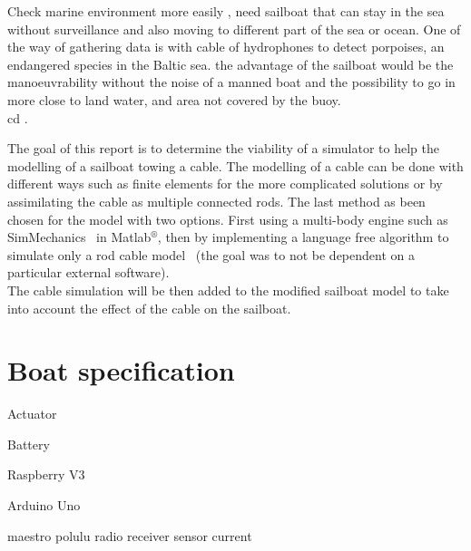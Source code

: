 Check marine environment more easily , need sailboat that can stay in the sea without surveillance 
and also moving to different part of the sea or ocean. One of the way of gathering data is with cable of 
hydrophones to detect porpoises, an endangered species in the Baltic sea. the advantage of the sailboat would be the manoeuvrability without the noise of a manned boat and the possibility to go in more close to land water, and area not covered by the buoy.\\
cd .


The goal of this report is to determine the viability of a simulator to help
the modelling of a sailboat towing a cable. The modelling of a cable can be done
with different ways such as finite elements for the more complicated solutions or by assimilating the cable
as multiple connected rods. The last method as been chosen for the model with two options. First using 
a multi-body engine such as SimMechanics\texttrademark~ in Matlab$^{\circledR}$, then by implementing a language free algorithm to simulate
only a rod cable model~\cite{johansen2007modelling} (the goal was to not be dependent on a particular external software).\\
The cable simulation will be then added to the modified sailboat model to take into account the effect of
the cable on the sailboat.

\section{Boat specification}

Actuator

Battery

Raspberry V3

Arduino Uno 

maestro polulu
 radio receiver
 sensor current
 
 
